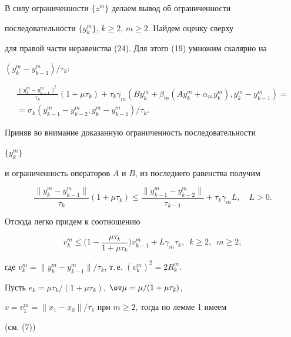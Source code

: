 В силу ограниченности $\{z^m\}$ делаем вывод об ограниченности


последовательности $\{y_k^m\}$, $k\geq 2$, $m\geq 2$. Найдем оценку сверху


для правой части неравенства (24). Для этого (19) умножим скалярно на


$(y_k^m-y_{k-1}^m)/\tau_k$:


\begin{multline*}


\frac{\|y_k^m-y_{k-1}^m\|^2}{\tau_k}(1+\mu \tau_k)


+\tau_k\gamma_m(By_k^m+\beta_m(Ay_k^m+


\alpha_my_k^m),y_k^m-y_{k-1}^m)= \\


%


=\sigma_k(y_{k-1}^m-y_{k-2}^m,y_k^m-y_{k-1}^m)/\tau_k.


\end{multline*}


Приняв во внимание доказанную ограниченность последовательности


$\{y_k^m\}$


и ограниченность операторов $A$ и $B$, из последнего равенства получим


$$


\frac{\|y_k^m-y_{k-1}^m\|}{\tau_k}(1+\mu \tau_k)\leq


\frac{\|y_{k-1}^m-y_{k-2}^m\|}{\tau_{k-1}}+\tau_k\gamma_mL,\quad L>0.


$$


Отсюда легко придем к соотношению


\begin{equation}\label {27}


v_k^m\leq \bigg(1-\frac{\mu \tau_k}{1+\mu \tau_k} \bigg)v_{k-1}^m


+L\gamma_m\tau_k,\ \;k\geq 2,\ \;m\geq 2,


\end{equation}


где $v_k^m=\|y_k^m-y_{k-1}^m\|/\tau_k$, т.\,е. $(v_k^m)^2=2R_k^m$.


Пусть $e_k=\mu \tau_k/(1+\mu \tau_k)$, $\ov \mu=\mu /(1+\mu \tau_2)$,


$v=v_1^m=\|x_1-x_0\|/\tau_1$ при $m \geq 2$, тогда по лемме 1 имеем


(см. (7))


